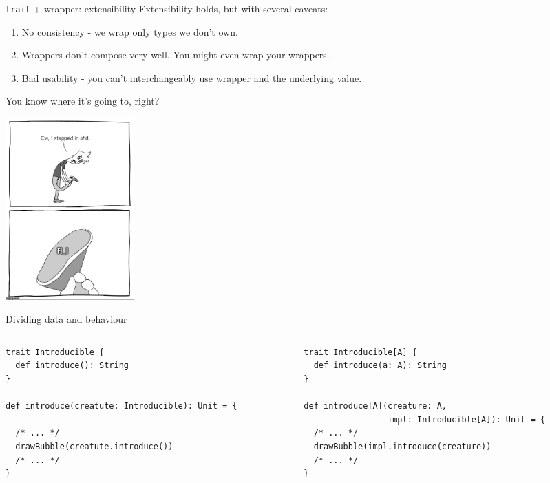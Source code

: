 \documentclass[presentation,aspectratio=169,smaller]{beamer}
\begin{document}
\begin{frame}[label={sec:org880a991},fragile]{\texttt{trait} + wrapper: extensibility}
 Extensibility holds, but with several caveats:

\begin{enumerate}
\item No consistency - we wrap only types we don't own.
\item Wrappers don't compose very well. You might even wrap your wrappers.
\item Bad usability - you can’t interchangeably use wrapper and the underlying
value.
\end{enumerate}
\end{frame}

\begin{frame}[label={sec:orgb1c8098}]{You know where it’s going to, right?}
\pause

\begin{center}
\includegraphics[height=7cm]{images/f_.jpg}
\end{center}
\end{frame}

\begin{frame}[label={sec:orga11bf30},fragile]{Dividing data and behaviour}
 \begin{columns}
\begin{column}[t]{0.5\columnwidth}
\begin{verbatim}
trait Introducible {
  def introduce(): String
}

def introduce(creatute: Introducible): Unit = {

  /* ... */
  drawBubble(creatute.introduce())
  /* ... */
}
\end{verbatim}

\pause
\end{column}

\begin{column}[t]{0.5\columnwidth}
\begin{verbatim}
trait Introducible[A] {
  def introduce(a: A): String
}

def introduce[A](creature: A,
                 impl: Introducible[A]): Unit = {
  /* ... */
  drawBubble(impl.introduce(creature))
  /* ... */
}
\end{verbatim}
\end{column}
\end{columns}
\end{frame}
\end{document}
